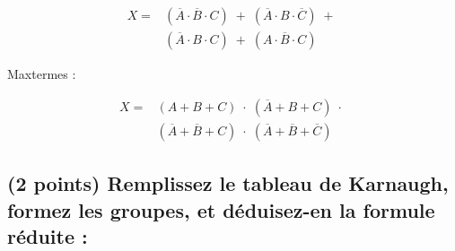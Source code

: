 \documentclass[11pt,a4paper]{article}
\begin{document}
\begin{table}[!ht]
\begin{minipage}{0.50\textwidth}
\begin{equation*}
    \begin{split}
X = & ( \overline{A} \cdot \overline{B} \cdot C ) \; + \; ( \overline{A} \cdot B \cdot \overline{C} ) \; + \; \\
    & ( \overline{A} \cdot B \cdot C ) \; + \; ( A \cdot \overline{B} \cdot C )
    \end{split}
\end{equation*}

\bigskip

Maxtermes :


\begin{equation*}
    \begin{split}
X = & ( A + B + C ) \; \cdot \; ( \overline{A} + B + C ) \; \cdot \; \\
    & ( \overline{A} + \overline{B} + C ) \; \cdot \; ( \overline{A} + \overline{B} + \overline{C} )
    \end{split}
\end{equation*}

  \end{minipage}
\end{table}

\bigskip

\subsection{(2 points) Remplissez le tableau de Karnaugh, formez les groupes, et déduisez-en la formule réduite : }

\end{document}
